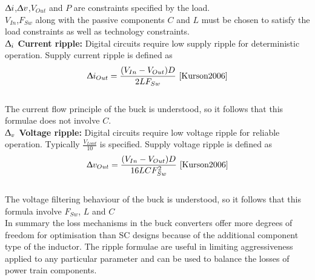 \documentclass[letterpaper,twocolumn,10pt]{article}
\begin{document}
$\Updelta i$,$\Updelta v$,$V_{Out}$ and $P$ are constraints specified by the load.\\
$V_{In}$,$F_{Sw}$ along with the passive components $C$ and $L$ must be chosen to satisfy the load constraints as well as technology constraints.\\
\textbf{$\Updelta_i$ Current ripple: }Digital circuits require low supply ripple for deterministic operation. Supply current ripple is defined as\\
$$\Updelta i_{Out} = \frac{(V_{In} - V_{Out})D}{2LF_{Sw}} ~\cite{Kurson2006}$$ \\
The current flow principle of the buck is understood, so it follows that this formulae does not involve $C$.\\
\textbf{$\Updelta_v$ Voltage ripple: }Digital circuits require low voltage ripple for reliable operation. Typically $\frac{V_{Load}}{10}$ is specified. Supply voltage ripple is defined as\\
$$\Updelta v_{Out} = \frac{(V_{In} - V_{Out})D}{16LCF_{Sw}^2}  ~\cite{Kurson2006}$$\\
The voltage filtering behaviour of the buck is understood, so it follows that this formula involve $F_{Sw}$, $L$ and $C$\\

\indent In summary the loss mechanisms in the buck converters offer more degrees of freedom for optimisation than SC designs because of the additional component type of the inductor. The ripple formulae are useful in limiting aggressiveness applied to any particular parameter and can be used to balance the losses of power train components.
\end{document}
